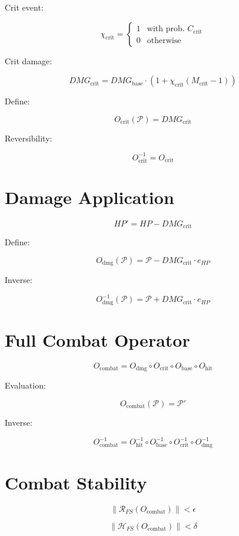 Crit event:

\[
\chi_{\text{crit}} =
\begin{cases}
1 & \text{with prob. } C_{\text{crit}} \\
0 & \text{otherwise}
\end{cases}
\]

Crit damage:

\[
DMG_{\text{crit}}
= DMG_{\text{base}} \cdot
\left(1 + \chi_{\text{crit}}(M_{\text{crit}} - 1)\right)
\]

Define:

\[
O_{\text{crit}}(\mathcal{P})
= DMG_{\text{crit}}
\]

Reversibility:

\[
O_{\text{crit}}^{-1} = O_{\text{crit}}
\]


\section*{Damage Application}

\[
HP' = HP - DMG_{\text{crit}}
\]

Define:

\[
O_{\text{dmg}}(\mathcal{P})
= \mathcal{P} - DMG_{\text{crit}} \cdot e_{HP}
\]

Inverse:

\[
O_{\text{dmg}}^{-1}(\mathcal{P})
= \mathcal{P} + DMG_{\text{crit}} \cdot e_{HP}
\]


\section*{Full Combat Operator}

\[
O_{\text{combat}}
= O_{\text{dmg}}
\circ O_{\text{crit}}
\circ O_{\text{base}}
\circ O_{\text{hit}}
\]

Evaluation:

\[
O_{\text{combat}}(\mathcal{P})
= \mathcal{P}'
\]

Inverse:

\[
O_{\text{combat}}^{-1}
= O_{\text{hit}}^{-1}
\circ O_{\text{base}}^{-1}
\circ O_{\text{crit}}^{-1}
\circ O_{\text{dmg}}^{-1}
\]


\section*{Combat Stability}

\[
\|\mathcal{R}_{FS}(O_{\text{combat}})\| < \epsilon
\]

\[
\|\mathcal{H}_{FS}(O_{\text{combat}})\| < \delta
\]

